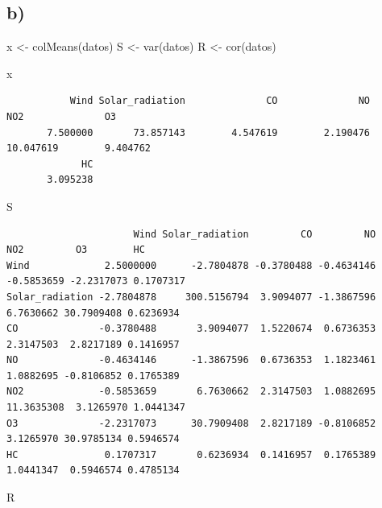 \documentclass[
]{article}
\newenvironment{Shaded}{\begin{snugshade}}{\end{snugshade}}
\newcommand{\FunctionTok}[1]{\textcolor[rgb]{0.00,0.00,0.00}{#1}}
\newcommand{\NormalTok}[1]{#1}
\newcommand{\OtherTok}[1]{\textcolor[rgb]{0.56,0.35,0.01}{#1}}
\begin{document}
\hypertarget{b-2}{%
\subsection{b)}\label{b-2}}

\begin{Shaded}
\begin{Highlighting}[]
\NormalTok{x }\OtherTok{\textless{}{-}} \FunctionTok{colMeans}\NormalTok{(datos)}
\NormalTok{S }\OtherTok{\textless{}{-}} \FunctionTok{var}\NormalTok{(datos)}
\NormalTok{R }\OtherTok{\textless{}{-}} \FunctionTok{cor}\NormalTok{(datos)}

\NormalTok{x}
\end{Highlighting}
\end{Shaded}

\begin{verbatim}
           Wind Solar_radiation              CO              NO             NO2              O3 
       7.500000       73.857143        4.547619        2.190476       10.047619        9.404762 
             HC 
       3.095238 
\end{verbatim}

\begin{Shaded}
\begin{Highlighting}[]
\NormalTok{S}
\end{Highlighting}
\end{Shaded}

\begin{verbatim}
                      Wind Solar_radiation         CO         NO        NO2         O3        HC
Wind             2.5000000      -2.7804878 -0.3780488 -0.4634146 -0.5853659 -2.2317073 0.1707317
Solar_radiation -2.7804878     300.5156794  3.9094077 -1.3867596  6.7630662 30.7909408 0.6236934
CO              -0.3780488       3.9094077  1.5220674  0.6736353  2.3147503  2.8217189 0.1416957
NO              -0.4634146      -1.3867596  0.6736353  1.1823461  1.0882695 -0.8106852 0.1765389
NO2             -0.5853659       6.7630662  2.3147503  1.0882695 11.3635308  3.1265970 1.0441347
O3              -2.2317073      30.7909408  2.8217189 -0.8106852  3.1265970 30.9785134 0.5946574
HC               0.1707317       0.6236934  0.1416957  0.1765389  1.0441347  0.5946574 0.4785134
\end{verbatim}

\begin{Shaded}
\begin{Highlighting}[]
\NormalTok{R}
\end{Highlighting}
\end{Shaded}
\end{document}
